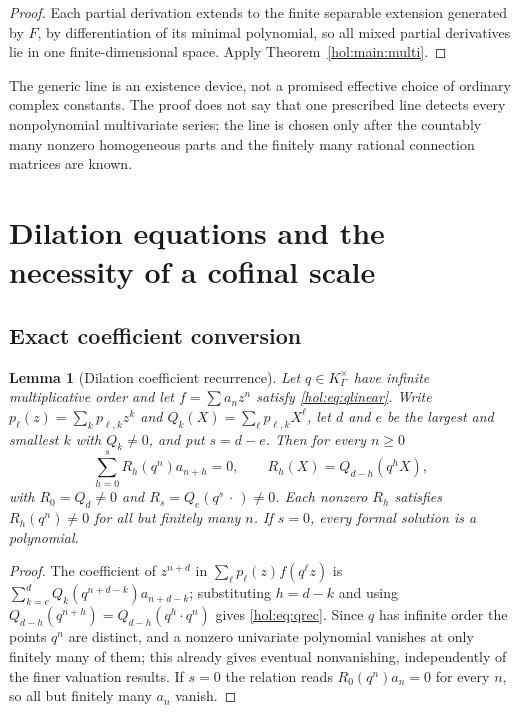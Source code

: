 \documentclass[11pt]{article}
\numberwithin{equation}{section}
\newtheorem{lemma}[theorem]{Lemma}
\theoremstyle{definition}
\theoremstyle{remark}
\newcommand{\K}{K_\Gamma}
\begin{document}
\begin{proof}
Each partial derivation extends to the finite separable extension generated by
$F$, by differentiation of its minimal polynomial, so all mixed partial
derivatives lie in one finite-dimensional space. Apply
Theorem~\ref{hol:main:multi}.
\end{proof}

The generic line is an existence device, not a promised effective choice of
ordinary complex constants. The proof does not say that one prescribed line
detects every nonpolynomial multivariate series; the line is chosen only after
the countably many nonzero homogeneous parts and the finitely many rational
connection matrices are known.

\section{Dilation equations and the necessity of a cofinal scale}
\label{hol:sec:qnecessity}

\subsection{Exact coefficient conversion}

\begin{lemma}[Dilation coefficient recurrence]\label{hol:lem:qrec}
Let $q\in\K^\times$ have infinite multiplicative order and let $f=\sum a_nz^n$
satisfy \eqref{hol:eq:qlinear}. Write $p_\ell(z)=\sum_kp_{\ell,k}z^k$ and
$Q_k(X)=\sum_\ell p_{\ell,k}X^\ell$, let $d$ and $e$ be the largest and
smallest $k$ with $Q_k\ne0$, and put $s=d-e$. Then for every $n\ge0$
\begin{equation}\label{hol:eq:qrec}
 \sum_{h=0}^sR_h(q^n)a_{n+h}=0,\qquad
 R_h(X)=Q_{d-h}(q^hX),
\end{equation}
with $R_0=Q_d\ne0$ and $R_s=Q_e(q^s\,\cdot\,)\ne0$. Each nonzero $R_h$
satisfies $R_h(q^n)\ne0$ for all but finitely many $n$. If $s=0$, every formal
solution is a polynomial.
\end{lemma}

\begin{proof}
The coefficient of $z^{n+d}$ in $\sum_\ell p_\ell(z)f(q^\ell z)$ is
$\sum_{k=e}^{d}Q_k(q^{n+d-k})a_{n+d-k}$; substituting $h=d-k$ and using
$Q_{d-h}(q^{n+h})=Q_{d-h}(q^h\cdot q^n)$ gives \eqref{hol:eq:qrec}. Since $q$
has infinite order the points $q^n$ are distinct, and a nonzero univariate
polynomial vanishes at only finitely many of them; this already gives eventual
nonvanishing, independently of the finer valuation results. If $s=0$ the
relation reads $R_0(q^n)a_n=0$ for every $n$, so all but finitely many $a_n$
vanish.
\end{proof}
\end{document}
